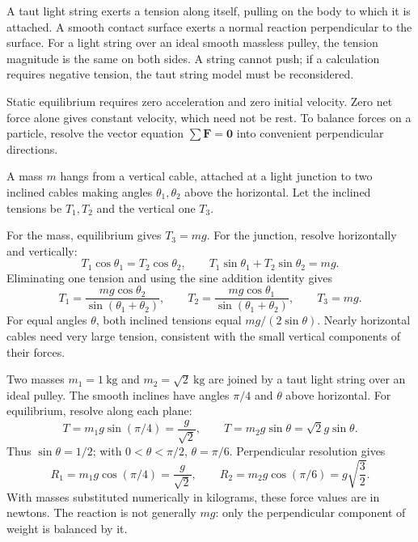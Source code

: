 A taut light string exerts a tension along itself, pulling on the body to
which it is attached. A smooth contact surface exerts a normal reaction
perpendicular to the surface. For a light string over an ideal smooth
massless pulley, the tension magnitude is the same on both sides.
A string cannot push; if a calculation requires negative tension, the taut
string model must be reconsidered.

Static equilibrium requires zero acceleration and zero initial velocity.
Zero net force alone gives constant velocity, which need not be rest.
To balance forces on a particle, resolve the vector equation
$\sum\mathbf F=\mathbf0$ into convenient perpendicular directions.


\begin{example}
A mass $m$ hangs from a vertical cable, attached at a light junction to two
inclined cables making angles $\theta_1,\theta_2$ above the horizontal.
Let the inclined tensions be $T_1,T_2$ and the vertical one $T_3$.

For the mass, equilibrium gives $T_3=mg$.
For the junction, resolve horizontally and vertically:
\[
T_1\cos\theta_1=T_2\cos\theta_2,\qquad
T_1\sin\theta_1+T_2\sin\theta_2=mg.
\]
Eliminating one tension and using the sine addition identity gives
\[
T_1=\frac{mg\cos\theta_2}{\sin(\theta_1+\theta_2)},\qquad
T_2=\frac{mg\cos\theta_1}{\sin(\theta_1+\theta_2)},\qquad T_3=mg.
\]
For equal angles $\theta$, both inclined tensions equal $mg/(2\sin\theta)$.
Nearly horizontal cables need very large tension, consistent with the
small vertical components of their forces.
\end{example}

\begin{example}
Two masses $m_1=1\ \mathrm{kg}$ and $m_2=\sqrt2\ \mathrm{kg}$ are joined
by a taut light string over an ideal pulley. The smooth inclines have
angles $\pi/4$ and $\theta$ above horizontal.
For equilibrium, resolve along each plane:
\[
T=m_1g\sin(\pi/4)=\frac g{\sqrt2},\qquad
T=m_2g\sin\theta=\sqrt2g\sin\theta.
\]
Thus $\sin\theta=1/2$; with $0<\theta<\pi/2$, $\theta=\pi/6$.
Perpendicular resolution gives
\[
R_1=m_1g\cos(\pi/4)=\frac g{\sqrt2},\qquad
R_2=m_2g\cos(\pi/6)=g\sqrt{\frac32}.
\]
With masses substituted numerically in kilograms, these force values are
in newtons. The reaction is not generally $mg$: only the perpendicular
component of weight is balanced by it.
\end{example}

